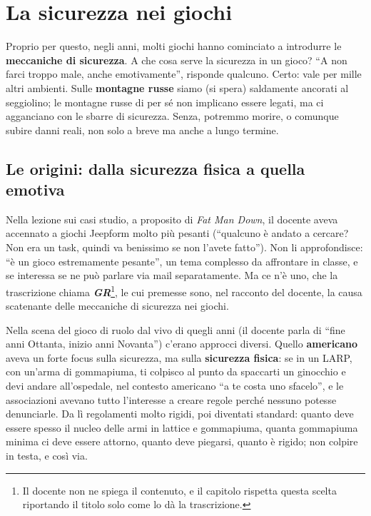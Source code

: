 \section{La sicurezza nei giochi}
\label{a5:sec:sicurezza}

Proprio per questo, negli anni, molti giochi hanno cominciato a introdurre le
\textbf{meccaniche di sicurezza}. A che cosa serve la sicurezza in un gioco? ``A non
farci troppo male, anche emotivamente'', risponde qualcuno. Certo: vale per mille
altri ambienti. Sulle \textbf{montagne russe} siamo (si spera) saldamente ancorati al
seggiolino; le montagne russe di per sé non implicano essere legati, ma ci agganciano
con le sbarre di sicurezza. Senza, potremmo morire, o comunque subire danni reali,
non solo a breve ma anche a lungo termine.

\subsection{Le origini: dalla sicurezza fisica a quella emotiva}

Nella lezione sui casi studio, a proposito di \emph{Fat Man Down}, il docente aveva
accennato a giochi Jeepform molto più pesanti (``qualcuno è andato a cercare? Non era
un task, quindi va benissimo se non l'avete fatto''). Non li approfondisce: ``è un gioco
estremamente pesante'', un tema complesso da affrontare in classe, e se interessa se ne
può parlare via mail separatamente. Ma ce n'è uno, che la trascrizione chiama
\textbf{\emph{GR}}\footnote{Il docente non ne spiega il contenuto, e il capitolo
rispetta questa scelta riportando il titolo solo come lo dà la trascrizione.}, le cui
premesse sono, nel racconto del docente, la causa scatenante delle meccaniche di
sicurezza nei giochi.

Nella scena del gioco di ruolo dal vivo di quegli anni (il docente parla di ``fine
anni Ottanta, inizio anni Novanta'') c'erano approcci diversi. Quello
\textbf{americano} aveva un forte focus sulla sicurezza, ma sulla \textbf{sicurezza
fisica}: se in un LARP, con un'arma di gommapiuma, ti colpisco al punto da spaccarti
un ginocchio e devi andare all'ospedale, nel contesto americano ``a te costa uno
sfacelo'', e le associazioni avevano tutto l'interesse a creare regole perché nessuno
potesse denunciarle. Da lì regolamenti molto rigidi, poi diventati standard: quanto
deve essere spesso il nucleo delle armi in lattice e gommapiuma, quanta gommapiuma
minima ci deve essere attorno, quanto deve piegarsi, quanto è rigido; non colpire in
testa, e così via.

